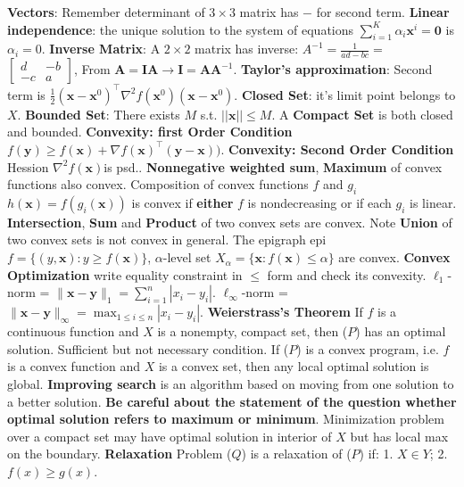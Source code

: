 \documentclass{article}
\def\x{\bm{x}}
\def\y{\bm{y}}
\def\A{\bm{A}}
\def\y{\bm{y}}
\begin{document}
\noindent
\textbf{Vectors}: Remember determinant of $3\times3$ matrix has $-$ for second term.
\textbf{Linear independence}: the unique solution to the system of equations $\sum_{i=1}^{K}\alpha_{i}\textbf{x}^{i}=\textbf{0}$ is $\alpha_i=0$.
\textbf{Inverse Matrix}: A $2 \times 2$ matrix has inverse: $A^{-1}=\frac{1}{ad-bc}=$ $\begin{bmatrix}d & -b \\ -c & a \end{bmatrix}$, From $\A = \bm{I}\A \to \bm{I} = \A \A^{-1}$.
\textbf{Taylor's approximation}: Second term is $\frac{1}{2}(\textbf{x}-\textbf{x}^{0})^{\top} \nabla^{2}f(\textbf{x}^{0})(\textbf{x}-\textbf{x}^{0})$.
\textbf{Closed Set}: it's limit point belongs to $\textit{X}$.
\textbf{Bounded Set}: There exists $\textit{M}$ s.t. $||\x||\le \textit{M}$.
A \textbf{Compact Set} is both closed and bounded.
\textbf{Convexity: first Order Condition} $f(\textbf{y}) \ge f(\textbf{x}) + \nabla f(\textbf{x})^{\top}(\textbf{y}-\textbf{x}))$.
\textbf{Convexity: Second Order Condition} Hession $\nabla^{2}f(\textbf{x})$is psd..
\textbf{Nonnegative weighted sum}, \textbf{Maximum} of convex functions also convex. Composition of convex functions $f$ and $g_i$ $h(\textbf{x})=f(g_i(\textbf{x}))$ is convex if \textbf{either} $f$ is nondecreasing or if each $g_{i}$ is linear.
\textbf{Intersection}, \textbf{Sum} and \textbf{Product} of two convex sets are convex. Note \textbf{Union} of two convex sets is not convex in general.
The epigraph epi$\textit{f}=\{(y,\textbf{x}): y\ge f(\textbf{x})\}$, $\alpha$-level set $\textit{X}_{\alpha}=\{\textbf{x}:f(\textbf{x})\le \alpha\}$ are convex.
\textbf{Convex Optimization} write equality constraint in $\le$ form and check its convexity.
$\ell_1$-norm = $\|\x - \y\|_1 = {\sum_{i=1}^n |x_i-y_i|}$.
$\ell_\infty$-norm = $\|\x - \y\|_\infty = \max_{1\le i\le n} |x_i-y_i|$.
\textbf{Weierstrass's Theorem} If $f$ is a continuous function and $X$ is a nonempty, compact set, then ($P$) has an optimal solution. Sufficient but not necessary condition.
If ($P$) is a convex program, i.e. $f$ is a convex function and $X$ is a convex set, then any local optimal solution is global.
\textbf{Improving search} is an algorithm based on moving from one solution to a better solution.
\textbf{Be careful about the statement of the question whether optimal solution refers to maximum or minimum}. Minimization problem over a compact set may have optimal solution in interior of $X$ but has local max on the boundary.
\textbf{Relaxation} Problem ($Q$) is a relaxation of ($P$) if: 1. $X \in Y$; 2. $f(x) \ge g(x)$.
\end{document}
